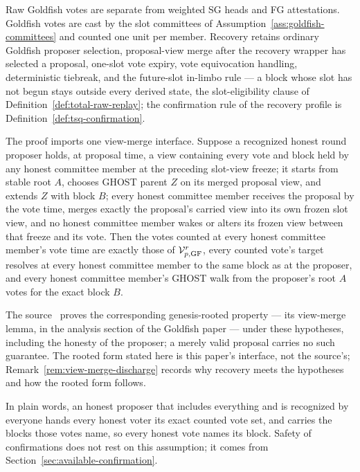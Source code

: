 \begin{assumption}
\label{ass:recovery-goldfish}
Raw Goldfish votes are separate from weighted SG heads and FG attestations.
Goldfish votes are cast by the slot committees of
Assumption~\ref{ass:goldfish-committees} and counted one unit per member.
Recovery retains ordinary Goldfish proposer selection, proposal-view merge
after the recovery wrapper has selected a proposal, one-slot vote expiry,
vote equivocation handling, deterministic tiebreak, and the future-slot
in-limbo rule --- a block whose slot has not begun stays outside every
derived state, the slot-eligibility clause of
Definition~\ref{def:total-raw-replay}; the confirmation
rule of the recovery profile is Definition~\ref{def:tsq-confirmation}.

The proof imports one view-merge interface.  Suppose a recognized honest
round proposer holds, at proposal time, a view containing every vote and
block held by any honest committee member at the preceding slot-view
freeze; it starts from stable root \(A\), chooses GHOST parent \(Z\) on
its merged proposal view, and extends \(Z\) with block \(B\); every honest
committee member receives the proposal by the vote time, merges exactly
the proposal's carried view into its own frozen slot view, and no honest
committee member wakes or alters its frozen view between that freeze and
its vote.  Then the votes counted at every honest committee member's
vote time are exactly those of \(\mathcal V_{p,\rm GF}^r\), every
counted vote's target resolves at every honest committee member to the
same block as at the proposer, and every honest committee member's
GHOST walk from the proposer's root \(A\) votes for the exact block
\(B\).

The source~\cite{goldfish} proves the corresponding
genesis-rooted property --- its view-merge lemma, in the analysis
section of the Goldfish paper --- under these hypotheses, including the
honesty of the proposer; a merely valid proposal carries no such
guarantee.  The rooted form stated here is this paper's interface, not
the source's; Remark~\ref{rem:view-merge-discharge} records why
recovery meets the hypotheses and how the rooted form follows.

In plain words, an honest proposer that includes everything and is
recognized by everyone hands every honest voter its exact counted vote
set, and carries the blocks those votes name, so every honest vote
names its block.  Safety of confirmations does not rest on
this assumption; it comes from Section~\ref{sec:available-confirmation}.
\end{assumption}

